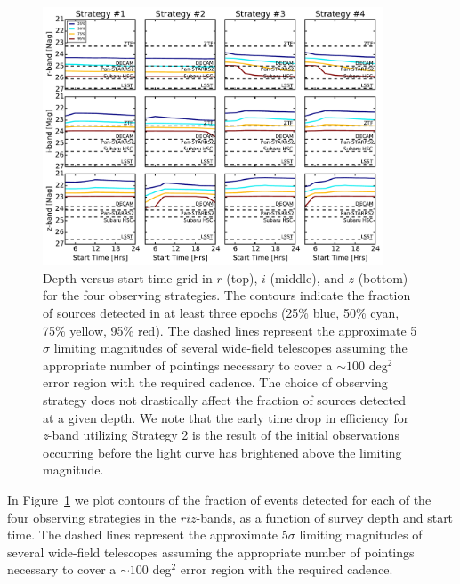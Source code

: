 \begin{figure}[t!]
\centering
\includegraphics[width=0.9\textwidth]{./figs/chapter2/ch2_f4.pdf}
\caption{Depth versus start time grid in $r$ (top), $i$ (middle), and $z$ (bottom) for the four observing strategies. The contours indicate the fraction of sources detected in at least three epochs (25\% blue, 50\% cyan, 75\% yellow, 95\% red). The dashed lines represent the approximate 5$\sigma$ limiting magnitudes of several wide-field telescopes assuming the appropriate number of pointings necessary to cover a $\sim 100$ deg$^2$ error region with the required cadence. The choice of observing strategy does not drastically affect the fraction of sources detected at a given depth. We note that the early time drop in efficiency for {\em z}-band utilizing Strategy 2 is the result of the initial observations occurring before the light curve has brightened above the limiting magnitude.}
\label{fig:ch2_det}
\end{figure}

In Figure~\ref{fig:ch2_det} we plot contours of the fraction of events detected for each of the four observing strategies in the $riz$-bands, as a function of survey depth and start time. The dashed lines represent the approximate 5$\sigma$ limiting magnitudes of several wide-field telescopes assuming the appropriate number of pointings necessary to cover a $\sim 100$ deg$^2$ error region with the required cadence.

